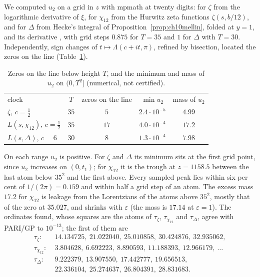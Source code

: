 We computed $u_2$ on a grid in $z$ with mpmath at twenty digits: for $\zeta$ from the logarithmic derivative of $\xi$, for $\chi_{12}$ from the Hurwitz zeta functions $\zeta(s,b/12)$, and for $\Delta$ from Hecke's integral of Proposition~\ref{prop:ch10mellin}, folded at $y=1$, and its derivative \cite{hecke1936}, with grid steps $0.875$ for $T=35$ and $1$ for $\Delta$ with $T=30$. Independently, sign changes of $t\mapsto\Lambda(c+it,\pi)$, refined by bisection, located the zeros on the line (Table~\ref{tab:scholzescan}).

\begin{table}[ht]
\centering
\caption{Zeros on the line below height $T$, and the minimum and mass of $u_2$ on $(0,T^2]$ (numerical, not certified).}\label{tab:scholzescan}
\begin{tabular}{lcccc}
clock & $T$ & zeros on the line & $\min u_2$ & mass of $u_2$\\[2pt]
$\zeta$, $c=\frac12$ & $35$ & $5$ & $2.4\cdot10^{-5}$ & $4.99$\\
$L(s,\chi_{12})$, $c=\frac12$ & $35$ & $17$ & $4.0\cdot10^{-4}$ & $17.2$\\
$L(s,\Delta)$, $c=6$ & $30$ & $8$ & $1.3\cdot10^{-4}$ & $7.98$
\end{tabular}
\end{table}

On each range $u_2$ is positive. For $\zeta$ and $\Delta$ its minimum sits at the first grid point, since $u_2$ increases on $(0,t_1)$; for $\chi_{12}$ it is the trough at $z=1158.5$ between the last atom below $35^2$ and the first above. Every sampled peak lies within six per cent of $1/(2\pi)=0.159$ and within half a grid step of an atom. The excess mass $17.2$ for $\chi_{12}$ is leakage from the Lorentzians of the atoms above $35^2$, mostly that of the zero at $35.027$, and shrinks with $\varepsilon$ (the mass is $17.14$ at $\varepsilon=1$). The ordinates found, whose squares are the atoms of $\tau_\zeta$, $\tau_{\chi_{12}}$ and $\tau_\Delta$, agree with PARI/GP \cite{pari2023} to $10^{-13}$; the first of them are
\[
\begin{aligned}
\tau_\zeta:\;& 14.134725,\ 21.022040,\ 25.010858,\ 30.424876,\ 32.935062, \\
\tau_{\chi_{12}}:\;& 3.804628,\ 6.692223,\ 8.890593,\ 11.188393,\ 12.966179,\ \dots \\
\tau_\Delta:\;& 9.222379,\ 13.907550,\ 17.442777,\ 19.656513,\\
& 22.336104,\ 25.274637,\ 26.804391,\ 28.831683 .
\end{aligned}
\]

